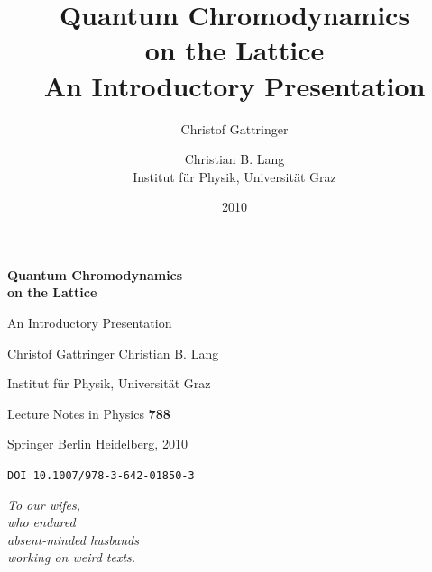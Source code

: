 \documentclass[11pt]{book}
\title{\textbf{Quantum Chromodynamics\\ on the Lattice}\\ \large An Introductory Presentation}
\author{Christof Gattringer \and Christian B. Lang\\[4mm]
        \normalsize Institut f\"ur Physik, Universit\"at Graz}
\date{2010}
\begin{document}
\frontmatter

\begin{titlepage}
  \centering
  \vspace*{2.5cm}
  {\Huge\bfseries Quantum Chromodynamics\\[4mm] on the Lattice\par}
  \vspace{8mm}
  {\LARGE An Introductory Presentation\par}
  \vspace{20mm}
  {\Large Christof Gattringer \quad Christian B. Lang\par}
  \vspace{4mm}
  {\large Institut f\"ur Physik, Universit\"at Graz\par}
  \vspace{20mm}
  {\large Lecture Notes in Physics \textbf{788}\par}
  \vspace{3mm}
  {\normalsize Springer Berlin Heidelberg, 2010\par}
  \vspace{2mm}
  {\small \texttt{DOI 10.1007/978-3-642-01850-3}\par}
  \vfill
\end{titlepage}

\thispagestyle{empty}
\vspace*{\fill}
\begin{center}
\begin{minipage}{0.8\textwidth}\centering
\textit{To our wifes,\\ who endured\\ absent-minded husbands\\ working on weird texts.}
\end{minipage}
\end{center}
\vspace*{\fill}
\clearpage

\tableofcontents



\mainmatter














\appendix


\backmatter
\end{document}
